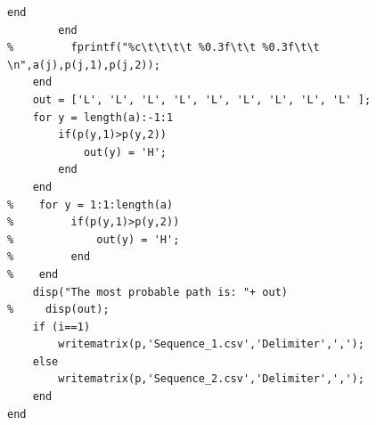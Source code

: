 \documentclass{article}
\begin{document}
\begin{lstlisting}[frame=single]
            end
        end
%         fprintf("%c\t\t\t\t %0.3f\t\t %0.3f\t\t \n",a(j),p(j,1),p(j,2));
    end
    out = ['L', 'L', 'L', 'L', 'L', 'L', 'L', 'L', 'L' ];
    for y = length(a):-1:1
        if(p(y,1)>p(y,2))
            out(y) = 'H';
        end
    end
%    for y = 1:1:length(a)
%         if(p(y,1)>p(y,2))
%             out(y) = 'H';
%         end
%    end
    disp("The most probable path is: "+ out)
%     disp(out);
    if (i==1)
        writematrix(p,'Sequence_1.csv','Delimiter',',');
    else
        writematrix(p,'Sequence_2.csv','Delimiter',',');
    end
end
\end{lstlisting}
\end{document}
